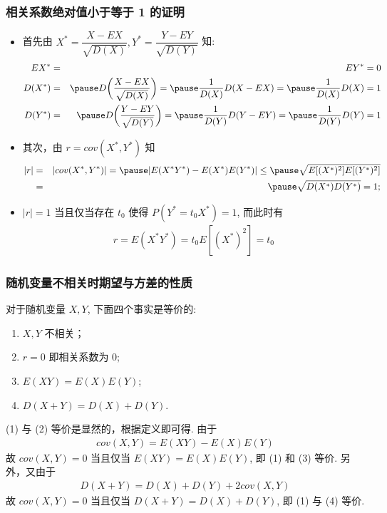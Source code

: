 \documentclass[Prob-All.tex]{subfiles}
\begin{document}
\begin{frame}
	\frametitle{相关系数绝对值小于等于 1 的证明}
	\begin{itemize}[<+-|alert@+>]
		\item 首先由 $X^*=\dfrac{X-EX}{\sqrt{D (X)}}, Y^*=\dfrac{Y-EY}{\sqrt{D (Y)}}$ 知:
		\begin{eqnarray*}
			EX^*&=&EY^*=0\\
			D(X^*)&=&\pause D\bigg(\dfrac{X-EX}{\sqrt{D(X)}}\bigg)=\pause \dfrac{1}{D(X)}D(X-EX)=\pause \dfrac{1}{D(X)}D(X)=1\\
			D(Y^*)&=&\pause D\bigg(\dfrac{Y-EY}{\sqrt{D(Y)}}\bigg)=\pause \dfrac{1}{D(Y)}D(Y-EY)=\pause \dfrac{1}{D(Y)}D(Y)=1\\
		\end{eqnarray*}
		\item 其次，由 $r=cov (X^*,Y^*)$ 知
		\begin{eqnarray*}
			|r|&=&|cov(X^*,Y^*)|=\pause |E(X^*Y^*)-E(X^*)E(Y^*)|\le\pause  \sqrt{E[(X^*)^2]E[(Y^*)^2]}\\
			&=&\pause \sqrt{D(X^*)D(Y^*)}=1;
		\end{eqnarray*}
		\item $|r|=1$ 当且仅当存在 $t_0$ 使得 $P (Y^*=t_0X^*)=1$, 而此时有
		\begin{eqnarray*}
			r=E(X^*Y^*)=t_0E[(X^*)^2]=t_0
		\end{eqnarray*}
	\end{itemize}
\end{frame}
\begin{frame}
	\frametitle{随机变量不相关时期望与方差的性质}
	\begin{thm}
		对于随机变量 $X,Y$, 下面四个事实是等价的:
		\begin{enumerate}
			\item $X,Y$ 不相关；
			\item $r=0$ 即相关系数为 $0$;
			\item $E(XY)=E(X)E(Y)$;
			\item $D(X+Y)=D(X)+D(Y)$.
		\end{enumerate}
	\end{thm}

	\pause \zheng (1) 与 (2) 等价是显然的，根据定义即可得. \pause 由于
	\begin{eqnarray*}
		cov(X,Y)=E(XY)-E(X)E(Y)
	\end{eqnarray*}
	\pause 故 $cov (X,Y)=0$ 当且仅当 $E (XY)=E (X) E (Y)$, 即 (1) 和 (3) 等价. \pause 另外，又由于
	\begin{eqnarray*}
		D(X+Y)=D(X)+D(Y)+2cov(X,Y)
	\end{eqnarray*}
	故 $cov (X,Y)=0$ 当且仅当 $D (X+Y)=D (X)+D (Y)$, 即 (1) 与 (4) 等价.
\end{frame}
\end{document}
